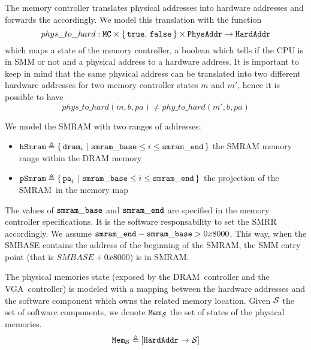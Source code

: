 The memory controller translates physical addresses into hardware addresses and
forwards the \IO accordingly. We model this translation with the function \[
phys\_to\_hard : \texttt{MC} \times \{\,\mathtt{true},\,\mathtt{false}\,\}
\times \texttt{PhysAddr} \rightarrow \texttt{HardAddr} \] which maps a state of
the memory controller, a boolean which tells if the CPU is in SMM or not and a
physical address to a hardware address.  It is important to keep in mind that
the same physical address can be translated into two different hardware
addresses for two memory controller states $m$ and $m'$, hence it is possible to
have \[ phys\_to\_hard(m, b, pa) \neq phy\_to\_hard(m', b, pa) \]

We model the SMRAM with two ranges of addresses:
\begin{itemize}
  \item $\texttt{hSmram} \triangleq \{\,\mathtt{dram}_i\ |\ \mathtt{smram\_base} \leq
    i \le \mathtt{smram\_end}\,\}$ the SMRAM memory range within the DRAM memory
  \item $\texttt{pSmram} \triangleq \{\,\mathtt{pa}_i\ |\ \mathtt{smram\_base} \leq i
    \le \mathtt{smram\_end}\,\}$ the projection of the SMRAM in the memory map
\end{itemize}

The values of $\mathtt{smram\_base}$ and $\mathtt{smram\_end}$ are specified in the
memory controller specifications. It is the software responsability to set the
SMRR accordingly. We assume $\mathtt{smram\_end} - \mathtt{smram\_base} > 0x8000$.
This way, when the SMBASE contains the address of the beginning of the SMRAM,
the SMM entry point (that is $SMBASE + 0x8000$) is in SMRAM.

The physical memories state (exposed by the DRAM controller and the
VGA controller) is modeled with a mapping between the hardware addresses and the
software component which owns the related memory location. Given $\mathcal{S}$ the
set of software components, we denote $\texttt{Mem}_{\mathcal{S}}$ the set of states
of the physical memories. \[ \texttt{Mem}_{\mathcal{S}} \triangleq [
\texttt{HardAddr} \rightarrow \mathcal{S} ] \]

